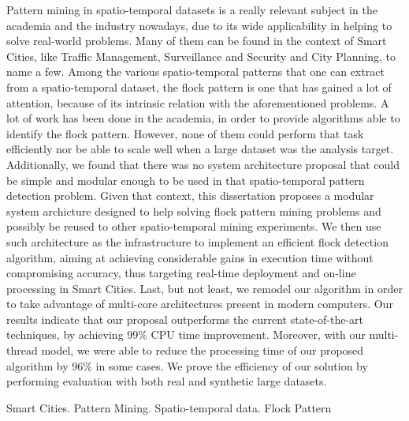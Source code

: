 \noindent
Pattern mining in spatio-temporal datasets is a really relevant subject in the academia and the industry nowadays, due
to its wide applicability in helping to solve real-world problems. Many of them can be found in the context of Smart
Cities, like Traffic Management, Surveillance and Security and City Planning, to name a few. Among the various
spatio-temporal patterns that one can extract from a spatio-temporal dataset, the flock pattern is one that has gained a
lot of attention, because of its intrinsic relation with the aforementioned problems. A lot of work has been done in the
academia, in order to provide algorithms able to identify the flock pattern. However, none of them could perform that
task efficiently nor be able to scale well when a large dataset was the analysis target. Additionally, we found that
there was no system architecture proposal that could be simple and modular enough to be used in that spatio-temporal
pattern detection problem. Given that context, this dissertation proposes a modular system archicture designed to help
solving flock pattern mining problems and possibly be reused to other spatio-temporal mining experiments. We then use
such architecture as the infrastructure to implement an efficient flock detection algorithm, aiming at achieving
considerable gains in execution time without compromising accuracy, thus targeting real-time deployment and on-line
processing in Smart Cities. Last, but not least, we remodel our algorithm in order to take advantage of multi-core
architectures present in modern computers. Our results indicate that our proposal outperforms the current
state-of-the-art techniques, by achieving 99\% CPU time improvement. Moreover, with our multi-thread model, we were able
to reduce the processing time of our proposed algorithm by 96\% in some cases. We prove the efficiency of our solution
by performing evaluation with both real and synthetic large datasets.

\begin{keywords}
Smart Cities. Pattern Mining. Spatio-temporal data. Flock Pattern
\end{keywords}
